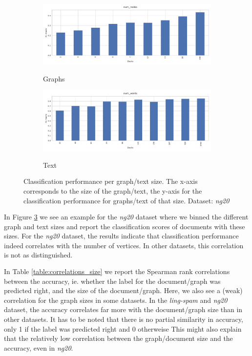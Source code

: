 \begin{figure}[htb!]
	\begin{subfigure}[t]{.5\linewidth}	{\includegraphics[width=\linewidth]{assets/figures/graph_binning_num_nodes.pdf}\label{fig:todo_1}}
	\caption{Graphs}
	\end{subfigure}
	\hfill
		\begin{subfigure}[t]{.5\linewidth}
	{\includegraphics[width=\linewidth]{assets/figures/text_binning_num_words.pdf}\label{fig:todo_2}}
	\caption{Text}
	\end{subfigure}
	\caption[Statistics: Histogram of classification performance per graph/text size]{Classification performance per graph/text size. The x-axis corresponds to the size of the graph/text, the y-axis for the classification performance for graphs/text of that size. Dataset: \textit{ng20}}\label{fig:graph_size_performance}
\end{figure}


In Figure \ref{fig:graph_size_performance} we see an example for the \textit{ng20} dataset where we binned the different graph and text sizes and report the classification scores of documents with these sizes.
For the \textit{ng20} dataset, the results indicate that classification performance indeed correlates with the number of vertices.
In other datasets, this correlation is not as distinguished.
\fi

In Table \ref{table:correlations_size} we report the Spearman rank correlations \cite{Hauke2011} between the accuracy, ie. whether the label for the document/graph was predicted right, and the size of the document/graph.
Here, we also see a (weak) correlation for the graph sizes in some datasets.
In the \textit{ling-spam} and \textit{ng20} dataset, the accuracy correlates far more with the document/graph size than in other datasets.
It has to be noted that there is no partial similarity in accuracy, only 1 if the label was predicted right and 0 otherweise
This might also explain that the relatively low correlation between the graph/document size and the accuracy, even in \textit{ng20}.

